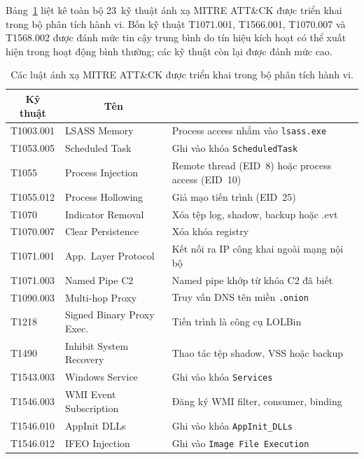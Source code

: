 \documentclass[../DoAn.tex]{subfiles}
\begin{document}
Bảng~\ref{tab:mitre-rules} liệt kê toàn bộ 23~kỹ thuật ánh xạ MITRE
ATT\&CK được triển khai trong bộ phân tích hành vi. Bốn kỹ thuật
T1071.001, T1566.001, T1070.007 và T1568.002 được đánh mức tin cậy
trung bình do tín hiệu kích hoạt có thể xuất hiện trong hoạt động
bình thường; các kỹ thuật còn lại được đánh mức cao.
\begin{table}[H]
\centering
\caption{Các luật ánh xạ MITRE ATT\&CK được triển khai trong bộ
  phân tích hành vi.}
\label{tab:mitre-rules}
\begin{tabular}{|l|l|>{\raggedright\arraybackslash}p{5.8cm}|}
\hline
\multicolumn{1}{|c|}{\textbf{Kỹ thuật}} & \multicolumn{1}{c|}{\textbf{Tên}} & \multicolumn{1}{c|}{\textbf{Tín hiệu kích hoạt}} \\
\hline
T1003.001   & LSASS Memory                & Process access nhắm vào \texttt{lsass.exe} \\
\hline
T1053.005   & Scheduled Task              & Ghi vào khóa \texttt{ScheduledTask} \\
\hline
T1055       & Process Injection           & Remote thread (EID~8) hoặc process access (EID~10) \\
\hline
T1055.012   & Process Hollowing           & Giả mạo tiến trình (EID~25) \\
\hline
T1070       & Indicator Removal           & Xóa tệp log, shadow, backup hoặc .evt \\
\hline
T1070.007   & Clear Persistence           & Xóa khóa registry \\
\hline
T1071.001   & App.\ Layer Protocol        & Kết nối ra IP công khai ngoài mạng nội bộ \\
\hline
T1071.003   & Named Pipe C2               & Named pipe khớp từ khóa C2 đã biết \\
\hline
T1090.003   & Multi-hop Proxy             & Truy vấn DNS tên miền \texttt{.onion} \\
\hline
T1218       & Signed Binary Proxy Exec.   & Tiến trình là công cụ LOLBin \\
\hline
T1490       & Inhibit System Recovery     & Thao tác tệp shadow, VSS hoặc backup \\
\hline
T1543.003   & Windows Service             & Ghi vào khóa \texttt{Services} \\
\hline
T1546.003   & WMI Event Subscription      & Đăng ký WMI filter, consumer, binding \\
\hline
T1546.010   & AppInit DLLs                & Ghi vào khóa \texttt{AppInit\_DLLs} \\
\hline
T1546.012   & IFEO Injection              & Ghi vào \texttt{Image File Execution} \\

\end{tabular}
\end{table}
\end{document}
